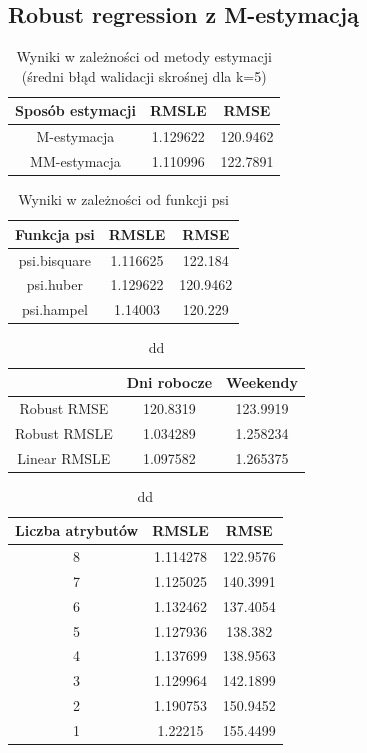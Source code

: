 \documentclass[a4paper,12pt]{article}
\begin{document}
    \subsection{Robust regression z M-estymacją}
	\begin{table}    
    \begin{tabular}{|c|c|c|}
    \hline 
    Sposób estymacji & RMSLE & RMSE \\ 
    \hline 
    M-estymacja & 1.129622 & 120.9462 \\ 
    \hline 
    MM-estymacja & 1.110996 & 122.7891 \\ 
    \hline 
    \end{tabular}
    \caption{Wyniki w zależności od metody estymacji (średni błąd walidacji skrośnej dla k=5)}
    \end{table} 
    	\begin{table}
			\begin{tabular}{|c|c|c|}
				\hline 
				Funkcja psi & RMSLE & RMSE \\ 
				\hline 
				psi.bisquare & 1.116625 & 122.184 \\ 
				\hline 
				psi.huber & 1.129622 & 120.9462 \\ 
				\hline 
				psi.hampel & 1.14003 & 120.229 \\ 
				\hline 
		    \end{tabular}
		    \caption{Wyniki w zależności od funkcji psi}     
    	\end{table}
    	
    	\begin{table}
    		\begin{tabular}{|c|c|c|}
				\hline 
				& Dni robocze & Weekendy \\ 
				\hline 
				Robust RMSE & 120.8319 & 123.9919 \\ 
				\hline 
				Robust RMSLE & 1.034289 & 1.258234 \\ 
				\hline 
				Linear RMSLE & 1.097582 & 1.265375 \\ 
				\hline 
    		\end{tabular} 
    		\caption{dd}
    	\end{table}
    	
    	\begin{table}
    		\begin{tabular}{|c|c|c|}
				\hline 
				Liczba atrybutów & RMSLE & RMSE \\ 
				\hline 
				8 & 1.114278 & 122.9576 \\ 
				\hline 
				7 & 1.125025 & 140.3991 \\ 
				\hline 
				6 & 1.132462 & 137.4054 \\ 
				\hline 
				5 & 1.127936 & 138.382 \\ 
				\hline 
				4 & 1.137699 & 138.9563 \\ 
				\hline 
				3 & 1.129964 & 142.1899 \\ 
				\hline 
				2 & 1.190753 & 150.9452 \\ 
				\hline 
				1 & 1.22215 & 155.4499 \\ 
				\hline 
    		\end{tabular} 
    		\caption{dd}
    	\end{table}
\end{document}
